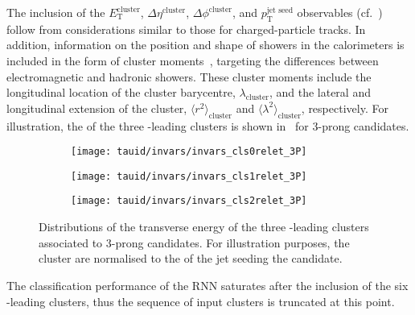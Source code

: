 The inclusion of the $E_{\text{T}}^{\text{cluster}}$,
$\Delta \eta^{\text{cluster}}$, $\Delta \phi^{\text{cluster}}$, and
$p_{\text{T}}^{\text{jet seed}}$ observables
(cf.~) follow from considerations
similar to those for charged-particle tracks. In addition, information
on the position and shape of showers in the calorimeters is included
in the form of cluster moments~\cite{PERF-2014-07}, targeting the
differences between electromagnetic and hadronic showers. These
cluster moments include the longitudinal location of the cluster
barycentre, $\lambda_{\text{cluster}}$, and the lateral and
longitudinal extension of the cluster,
$\langle r^2 \rangle_{\text{cluster}}$ and
$\langle \lambda^2 \rangle_{\text{cluster}}$, respectively. For
illustration, the \ET of the three \ET-leading clusters is shown
in~ for 3-prong \tauhadvis
candidates.

\begin{figure}[htbp]
  \centering

  \begin{subfigure}{0.33\textwidth}
    \texttt{[image: tauid/invars/invars\_cls0relet\_3P]}
    \subcaption{}%
    \label{fig:tauid_low_level_variables_cluster0}
  \end{subfigure}%
  \begin{subfigure}{0.33\textwidth}
    \texttt{[image: tauid/invars/invars\_cls1relet\_3P]}
    \subcaption{}%
    \label{fig:tauid_low_level_variables_cluster1}
  \end{subfigure}%
  \begin{subfigure}{0.33\textwidth}
    \texttt{[image: tauid/invars/invars\_cls2relet\_3P]}
    \subcaption{}%
    \label{fig:tauid_low_level_variables_cluster2}
  \end{subfigure}

  \caption[Distributions of the transverse energy of the three \ET-leading
  clusters associated to 3-prong \tauhadvis candidates.]{Distributions of the
    transverse energy of the three \ET-leading clusters associated to 3-prong
    \tauhadvis candidates. For illustration purposes, the cluster \ET are
    normalised to the \pT of the jet seeding the \tauhadvis candidate.}%
  \label{fig:tauid_low_level_variables_cluster}
\end{figure}

The classification performance of the RNN \tauid saturates after the
inclusion of the six \ET-leading clusters, thus the sequence of input
clusters is truncated at this point.


